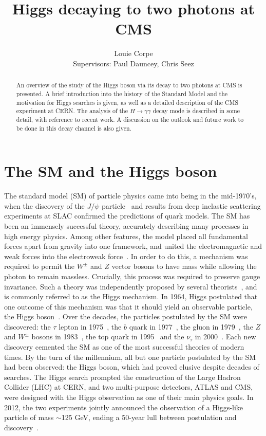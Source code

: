 \documentclass[10pt]{article}
\title{Higgs decaying to two photons at CMS}
\author{Louie Corpe \\Supervisors: Paul Dauncey, Chris Seez }
\begin{document}
\maketitle

\renewcommand{\abstractname}{}
\begin{abstract}
An overview of the study of the Higgs boson via its decay to two photons at CMS is presented. A brief introduction into the history of the Standard Model and the motivation for Higgs searches is given, as well as a detailed description of the CMS experiment at CERN. The analysis of the $H \rightarrow \gamma\gamma$ decay mode is described in some detail, with reference to recent work. A discussion on the outlook and future work to be done in this decay channel is also given.
\end{abstract}

\section{The SM and the Higgs boson}

The standard model (SM) of particle physics came into being in the mid-1970's, when the discovery of the $J / \psi$ particle~\cite{RichterPsi,TingJ} and results from deep inelastic scattering experiments at SLAC confirmed the predictions of quark models. The SM has been an immensely successful theory, accurately describing many processes in high energy physics. Among other features, the model placed all fundamental forces apart from gravity into one framework, and united the electromagnetic and weak forces into the electroweak force~\cite{GIM,Salam,Weinberg}. In order to do this, a mechanism was required to permit the $W^{\pm}$ and $Z$ vector bosons to have mass while allowing the photon to remain massless. Crucially, this process was required to preserve gauge invariance. Such a theory was independently proposed by several theorists~\cite{BroutEnglert,Higgs1,Higgs2,Kibble1,Higgs3,Kibble2}, and is commonly referred to as the Higgs mechanism. In 1964, Higgs postulated that one outcome of this mechanism was that it should yield an observable particle, the Higgs boson~\cite{Higgs2}. Over the decades, the particles postulated by the SM were discovered: the $\tau$ lepton in 1975~\cite{tauDisc}, the $b$ quark in 1977~\cite{bquarkDisc}, the gluon in 1979~\cite{Gluon1,Gluon2,Gluon3}, the $Z$ and $W^{\pm}$ bosons in 1983~\cite{ZDisc,WDisc}, the top quark in 1995~\cite{tquarkDisc1,tquarkDisc2} and the $\nu_{\tau}$ in 2000~\cite{TauNuDisc}. Each new discovery cemented the SM as one of the most successful theories of modern times. By the turn of the millennium, all but one particle postulated by the SM had been observed: the Higgs boson, which had proved elusive despite decades of searches. The Higgs search prompted the construction of the Large Hadron Collider (LHC) at CERN, and two multi-purpose detectors, ATLAS and CMS, were designed with the Higgs observation as one of their main physics goals. In 2012, the two experiments jointly announced the observation of a Higgs-like particle of mass $\sim$125 GeV, ending a 50-year lull between postulation and discovery~\cite{CMSHDisc,ATLASHDisc}.
\end{document}
